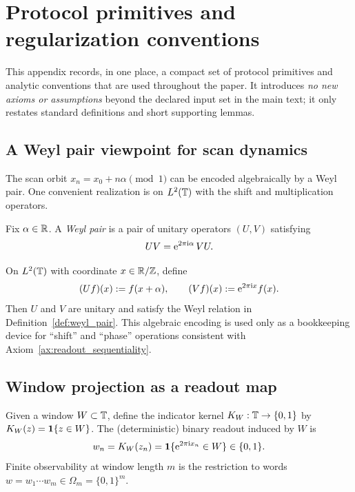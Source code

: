 \section{Protocol primitives and regularization conventions}
\label{app:protocol_primitives}

This appendix records, in one place, a compact set of protocol primitives and analytic conventions that are used throughout the paper.
It introduces \emph{no new axioms or assumptions} beyond the declared input set in the main text; it only restates standard definitions and short supporting lemmas.

\subsection{A Weyl pair viewpoint for scan dynamics}

The scan orbit $x_n=x_0+n\alpha\pmod{1}$ can be encoded algebraically by a Weyl pair.
One convenient realization is on $L^2(\mathbb{T})$ with the shift and multiplication operators.

\begin{definition}\label{def:weyl_pair}
Fix $\alpha\in\mathbb{R}$.
A \emph{Weyl pair} is a pair of unitary operators $(U,V)$ satisfying
\[
UV=\mathrm{e}^{2\pi\mathrm{i} \alpha}\,VU.
\]
\end{definition}

\begin{remark}\label{rem:weyl_pair_realization}
On $L^2(\mathbb{T})$ with coordinate $x\in\mathbb{R}/\mathbb{Z}$, define
\[
(Uf)(x):=f(x+\alpha),\qquad (Vf)(x):=\mathrm{e}^{2\pi\mathrm{i} x}f(x).
\]
Then $U$ and $V$ are unitary and satisfy the Weyl relation in Definition~\ref{def:weyl_pair}.
This algebraic encoding is used only as a bookkeeping device for ``shift'' and ``phase'' operations consistent with Axiom~\ref{ax:readout_sequentiality}.
\end{remark}

\subsection{Window projection as a readout map}

Given a window $W\subset\mathbb{T}$, define the indicator kernel $K_W:\mathbb{T}\to\{0,1\}$ by $K_W(z)=\mathbf{1}\{z\in W\}$.
The (deterministic) binary readout induced by $W$ is
\[
w_n=K_W(z_n)=\mathbf{1}\{\mathrm{e}^{2\pi\mathrm{i} x_n}\in W\}\in\{0,1\}.
\]
Finite observability at window length $m$ is the restriction to words $w=w_1\cdots w_m\in\Omega_m=\{0,1\}^m$.

